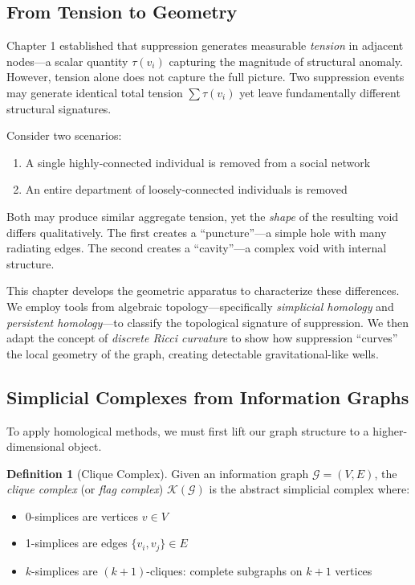 \documentclass[12pt,a4paper]{article}
\theoremstyle{definition}
\newtheorem{definition}{Definition}[section]
\theoremstyle{remark}
\newcommand{\Graph}{\mathcal{G}}         %
\begin{document}
\subsection{From Tension to Geometry}

Chapter 1 established that suppression generates measurable \emph{tension} in adjacent nodes—a scalar quantity $\tau(v_i)$ capturing the magnitude of structural anomaly. However, tension alone does not capture the full picture. Two suppression events may generate identical total tension $\sum \tau(v_i)$ yet leave fundamentally different structural signatures.

Consider two scenarios:
\begin{enumerate}
    \item A single highly-connected individual is removed from a social network
    \item An entire department of loosely-connected individuals is removed
\end{enumerate}

Both may produce similar aggregate tension, yet the \emph{shape} of the resulting void differs qualitatively. The first creates a ``puncture''—a simple hole with many radiating edges. The second creates a ``cavity''—a complex void with internal structure.

This chapter develops the geometric apparatus to characterize these differences. We employ tools from algebraic topology—specifically \emph{simplicial homology} and \emph{persistent homology}—to classify the topological signature of suppression. We then adapt the concept of \emph{discrete Ricci curvature} to show how suppression ``curves'' the local geometry of the graph, creating detectable gravitational-like wells.

\subsection{Simplicial Complexes from Information Graphs}

To apply homological methods, we must first lift our graph structure to a higher-dimensional object.

\begin{definition}[Clique Complex]
Given an information graph $\Graph = (V, E)$, the \emph{clique complex} (or \emph{flag complex}) $\mathcal{K}(\Graph)$ is the abstract simplicial complex where:
\begin{itemize}
    \item 0-simplices are vertices $v \in V$
    \item 1-simplices are edges $\{v_i, v_j\} \in E$
    \item $k$-simplices are $(k+1)$-cliques: complete subgraphs on $k+1$ vertices
\end{itemize}
\end{definition}
\end{document}
